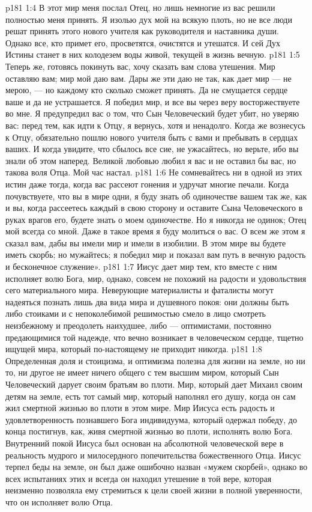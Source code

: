 \vs p181 1:4 В этот мир меня послал Отец, но лишь немногие из вас решили полностью меня принять. Я изолью дух мой на всякую плоть, но не все люди решат принять этого нового учителя как руководителя и наставника души. Однако все, кто примет его, просветятся, очистятся и утешатся. И сей Дух Истины станет в них колодезем воды живой, текущей в жизнь вечную.
\vs p181 1:5 Теперь же, готовясь покинуть вас, хочу сказать вам слова утешения. Мир оставляю вам; мир мой даю вам. Дары же эти даю не так, как дает мир --- не мерою, --- но каждому кто сколько сможет принять. Да не смущается сердце ваше и да не устрашается. Я победил мир, и все вы через веру восторжествуете во мне. Я предупредил вас о том, что Сын Человеческий будет убит, но уверяю вас: перед тем, как идти к Отцу, я вернусь, хотя и ненадолго. Когда же вознесусь к Отцу, обязательно пошлю нового учителя быть с вами и пребывать в сердцах ваших. И когда увидите, что сбылось все сие, не ужасайтесь, но верьте, ибо вы знали об этом наперед. Великой любовью любил я вас и не оставил бы вас, но такова воля Отца. Мой час настал.
\vs p181 1:6 Не сомневайтесь ни в одной из этих истин даже тогда, когда вас рассеют гонения и удручат многие печали. Когда почувствуете, что вы в мире одни, я буду знать об одиночестве вашем так же, как и вы, когда рассеетесь каждый в свою сторону и оставите Сына Человеческого в руках врагов его, будете знать о моем одиночестве. Но я никогда не одинок; Отец мой всегда со мной. Даже в такое время я буду молиться о вас. О всем же этом я сказал вам, дабы вы имели мир и имели в изобилии. В этом мире вы будете иметь скорбь; но мужайтесь; я победил мир и показал вам путь в вечную радость и бесконечное служение».
\vs p181 1:7 \pc Иисус дает мир тем, кто вместе с ним исполняет волю Бога, мир, однако, совсем не похожий на радости и удовольствия сего материального мира. Неверующие материалисты и фаталисты могут надеяться познать лишь два вида мира и душевного покоя: они должны быть либо стоиками и с непоколебимой решимостью смело в лицо смотреть неизбежному и преодолеть наихудшее, либо --- оптимистами, постоянно предающимися той надежде, что вечно возникает в человеческом сердце, тщетно ищущей мира, который по\hyp{}настоящему не приходит никогда.
\vs p181 1:8 Определенная доля и стоицизма, и оптимизма полезна для жизни на земле, но ни то, ни другое не имеет ничего общего с тем высшим миром, который Сын Человеческий дарует своим братьям во плоти. Мир, который дает Михаил своим детям на земле, есть тот самый мир, который наполнял его душу, когда он сам жил смертной жизнью во плоти в этом мире. Мир Иисуса есть радость и удовлетворенность познавшего Бога индивидуума, который одержал победу, до конца постигнув, как, живя смертной жизнью во плоти, исполнять волю Бога. Внутренний покой Иисуса был основан на абсолютной человеческой вере в реальность мудрого и милосердного попечительства божественного Отца. Иисус терпел беды на земле, он был даже ошибочно назван «мужем скорбей», однако во всех испытаниях этих и всегда он находил утешение в той вере, которая неизменно позволяла ему стремиться к цели своей жизни в полной уверенности, что он исполняет волю Отца.

